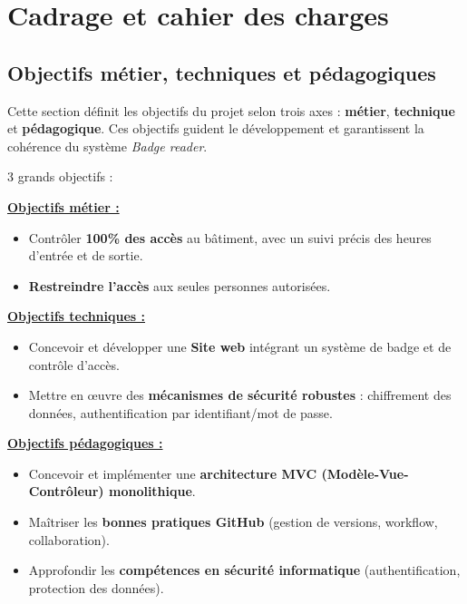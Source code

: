 \chapter{Cadrage et cahier des charges}

\section{Objectifs métier, techniques et pédagogiques}
Cette section définit les objectifs du projet selon trois axes : \textbf{métier}, \textbf{technique} et \textbf{pédagogique}.
Ces objectifs guident le développement et garantissent la cohérence du système \textit{Badge reader}.
\newline

\begin{for_you}{3 grands objectifs :}

    \textbf{\underline{Objectifs métier :}}
    \begin{itemize}
        \item Contrôler \textbf{100\% des accès} au bâtiment, avec un suivi précis des heures d’entrée et de sortie.
        \item \textbf{Restreindre l’accès} aux seules personnes autorisées.
        \newline
    \end{itemize}

    \textbf{\underline{Objectifs techniques :}}
    \begin{itemize}
        \item Concevoir et développer une \textbf{Site web} intégrant un système de badge et de contrôle d’accès.
        \item Mettre en œuvre des \textbf{mécanismes de sécurité robustes} : chiffrement des données, authentification par identifiant/mot de passe.
        \newline
    \end{itemize}

    \textbf{\underline{Objectifs pédagogiques :}}
    \begin{itemize}
        \item Concevoir et implémenter une \textbf{architecture MVC (Modèle-Vue-Contrôleur) monolithique}.
        \item Maîtriser les \textbf{bonnes pratiques GitHub} (gestion de versions, workflow, collaboration).
        \item Approfondir les \textbf{compétences en sécurité informatique} (authentification, protection des données).
    \end{itemize}
\end{for_you}

